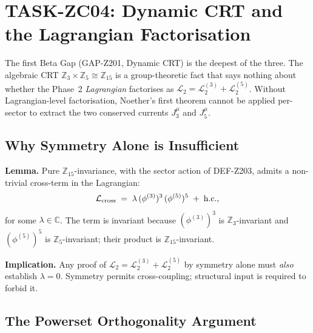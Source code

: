 \documentclass[12pt, a4paper]{article}
\begin{document}
\section{TASK-ZC04: Dynamic CRT and the Lagrangian Factorisation}
\label{sec:Z2-zc04}

The first Beta Gap (GAP-Z201, Dynamic CRT) is the deepest of the
three. The algebraic CRT $\mathbb{Z}_3 \times \mathbb{Z}_5 \cong
\mathbb{Z}_{15}$ is a group-theoretic fact that says nothing about
whether the Phase~2 \emph{Lagrangian} factorises as
$\mathcal{L}_2 = \mathcal{L}_2^{(3)} + \mathcal{L}_2^{(5)}$. Without
Lagrangian-level factorisation, Noether's first theorem cannot be
applied per-sector to extract the two conserved currents $J^\mu_3$
and $J^\mu_5$.

\subsection{Why Symmetry Alone is Insufficient}

\begin{formalbox}[title={LEM-DC01: Symmetry-vs-Structure Gap}]
\textbf{Lemma.} Pure $\mathbb{Z}_{15}$-invariance, with the sector
action of DEF-Z203, admits a non-trivial cross-term in the
Lagrangian:
\begin{equation}
  \mathcal{L}_{\rm cross}
  \;=\;
  \lambda \,
  (\phi^{(3)})^3\, (\phi^{(5)})^5
  \;+\;
  \mathrm{h.c.},
  \label{eq:LEM-DC01-cross}
\end{equation}
for some $\lambda \in \mathbb{C}$. The term is invariant because
$(\phi^{(3)})^3$ is $\mathbb{Z}_3$-invariant and $(\phi^{(5)})^5$ is
$\mathbb{Z}_5$-invariant; their product is $\mathbb{Z}_{15}$-invariant.

\textbf{Implication.} Any proof of $\mathcal{L}_2 = \mathcal{L}_2^{(3)}
+ \mathcal{L}_2^{(5)}$ by symmetry alone must \emph{also} establish
$\lambda = 0$. Symmetry permits cross-coupling; structural input is
required to forbid it.
\end{formalbox}

\subsection{The Powerset Orthogonality Argument}
\end{document}
